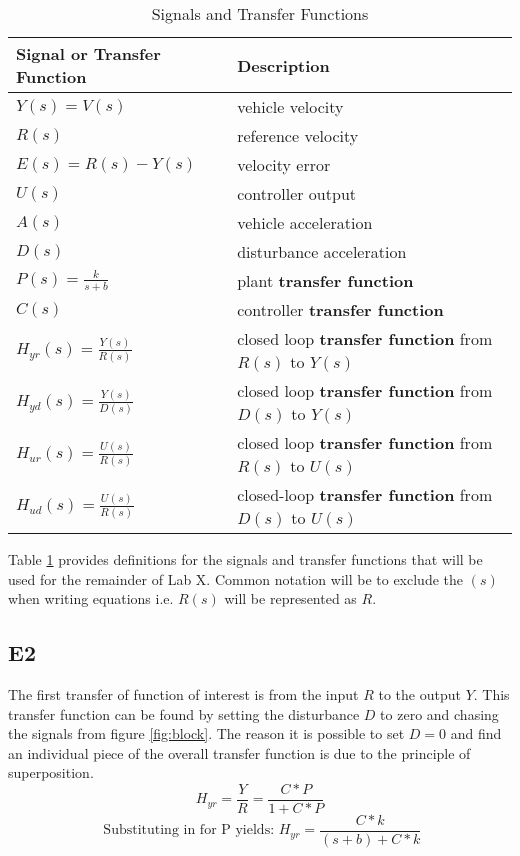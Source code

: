 \documentclass[11pt,titlepage]{article}
\begin{document}
	\begin{table}[!htb]
		\centering
		\begin{tabular}{|m{5cm}|m{9cm}|} 
		\hline
		Signal or Transfer Function & Description \\ 
		\hline
		$Y(s)=V(s)$ & vehicle velocity \\
		\hline
		$R(s)$ & reference velocity \\
		\hline
		$E(s)=R(s)-Y(s)$ & velocity error \\
		\hline
		$U(s)$ & controller output \\
		\hline
		$A(s)$ & vehicle acceleration \\
		\hline
		$D(s)$ & disturbance acceleration \\
		\hline 
		$P(s)=\frac{k}{s+b}$ & plant \textbf{transfer function} \\
		\hline 
		$C(s)$ & controller \textbf{transfer function} \\
		\hline 
		$H_{yr}(s)=\frac{Y(s)}{R(s)}$ & closed loop \textbf{transfer function} from $R(s)$ to $Y(s)$ \\
		\hline 
		$H_{yd}(s)=\frac{Y(s)}{D(s)}$ & closed loop \textbf{transfer function} from $D(s)$ to $Y(s)$ \\
		\hline 
		$H_{ur}(s)=\frac{U(s)}{R(s)}$ & closed loop \textbf{transfer function} from $R(s)$ to $U(s)$ \\
		\hline
		$H_{ud}(s)=\frac{U(s)}{R(s)}$ & closed-loop \textbf{transfer function} from $D(s)$ to $U(s)$ \\
		\hline
		\end{tabular}
		\caption{Signals and Transfer Functions} \label{table:SaTF}
		\end{table}

		\noindent Table \ref{table:SaTF} provides definitions for the signals and transfer functions that will be used for the remainder of Lab X. Common notation will be to exclude the $(s)$ when writing equations i.e. $R(s)$ will be represented as $R$.

	\subsection*{E2}
		The first transfer of function of interest is from the input $R$ to the output $Y$. This transfer function can be found by setting the disturbance $D$ to zero and chasing the signals from figure \ref{fig:block}. The reason it is possible to set $D=0$ and find an individual piece of the overall transfer function is due to the principle of superposition.
		\begin{equation}
			H_{yr}=\frac{Y}{R}=\frac{C*P}{1+C*P}
		\end{equation}
		\begin{equation} \label{eq:Hyr}
			\mbox{ Substituting in for P yields: } H_{yr}=\frac{C*k}{(s+b)+C*k}
		\end{equation} 
	
\end{document}
